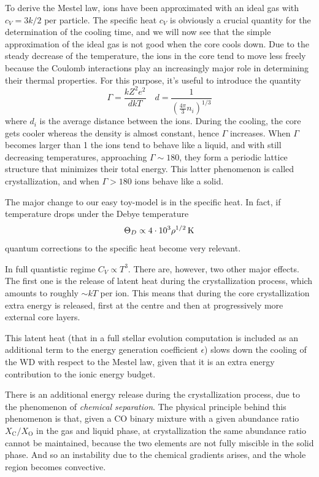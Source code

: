 \par To derive the Mestel law, ions have been approximated with an ideal gas with $c_{V} = 3k/2$ per particle. The specific heat $c_{V}$ is obviously a crucial quantity for the determination of the cooling time, and we will now see that the simple approximation of the ideal gas is not good when the core cools down. Due to the steady decrease of the temperature, the ions in the core tend to move less freely because the Coulomb interactions play an increasingly major role in determining their thermal properties. For this purpose, it's useful to introduce the quantity
\begin{equation}
    \Gamma = \frac{kZ^{2}e^{2}}{dkT} \quad d = \frac{1}{\left(\frac{4\pi}{3}n_{i}\right)^{1/3}}
\end{equation}
where $d_{i}$ is the average distance between the ions. During the cooling, the core gets cooler whereas the density is almost constant, hence $\Gamma$ increases. When $\Gamma$ becomes larger than 1 the ions tend to behave like a liquid, and with still decreasing temperatures, approaching $\Gamma \sim 180$, they form a periodic lattice structure that minimizes their total energy. This latter phenomenon is called crystallization, and when $\Gamma > 180$ ions behave like a solid.
\par The major change to our easy toy-model is in the specific heat. In fact, if temperature drops under the Debye temperature 
\begin{equation}
    \Theta_{D} \propto 4\cdot 10^{3}\rho^{1/2}\,\text{K}
    \label{eq:debyetemp}
\end{equation}
quantum corrections to the specific heat become very relevant.
\par In full quantistic regime $C_{V}\propto T^{3}$. There are, however, two other major effects. The first one is the release of latent heat during the crystallization process, which amounts to roughly $\sim kT$ per ion. This means that during the core crystallization extra energy is released, first at the centre and then at progressively more external core layers.
\par This latent heat (that in a full stellar evolution computation is included as an additional term to the energy generation coefficient $\epsilon$) slows down the cooling of the WD with respect to the Mestel law, given that it is an extra energy contribution to the ionic energy budget.
\par There is an additional energy release during the crystallization process, due to the phenomenon of \emph{chemical separation}. The physical principle behind this phenomenon is that, given a CO binary mixture with a given abundance ratio $X_{\text{C}}/X_{\text{O}}$ in the gas and liquid phase, at crystallization the same abundance ratio cannot be maintained, because the two elements are not fully miscible in the solid phase. And so an instability due to the chemical gradients arises, and the whole region becomes convective.
